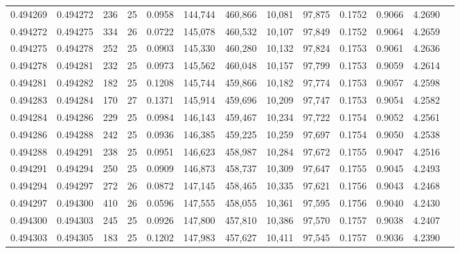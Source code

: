 \begin{tabular}{rrrrrrrrrrrrr}
0.494269 & 0.494272 & 236 &  25 &                                     0.0958 & 144,744 & 460,866 &  10,081 &  97,875 & 0.1752 & 0.9066 & 4.2690 \\
0.494272 & 0.494275 & 334 &  26 &                                     0.0722 & 145,078 & 460,532 &  10,107 &  97,849 & 0.1752 & 0.9064 & 4.2659 \\
0.494275 & 0.494278 & 252 &  25 &                                     0.0903 & 145,330 & 460,280 &  10,132 &  97,824 & 0.1753 & 0.9061 & 4.2636 \\
0.494278 & 0.494281 & 232 &  25 &                                     0.0973 & 145,562 & 460,048 &  10,157 &  97,799 & 0.1753 & 0.9059 & 4.2614 \\
0.494281 & 0.494282 & 182 &  25 &                                     0.1208 & 145,744 & 459,866 &  10,182 &  97,774 & 0.1753 & 0.9057 & 4.2598 \\
0.494283 & 0.494284 & 170 &  27 &                                     0.1371 & 145,914 & 459,696 &  10,209 &  97,747 & 0.1753 & 0.9054 & 4.2582 \\
0.494284 & 0.494286 & 229 &  25 &                                     0.0984 & 146,143 & 459,467 &  10,234 &  97,722 & 0.1754 & 0.9052 & 4.2561 \\
0.494286 & 0.494288 & 242 &  25 &                                     0.0936 & 146,385 & 459,225 &  10,259 &  97,697 & 0.1754 & 0.9050 & 4.2538 \\
0.494288 & 0.494291 & 238 &  25 &                                     0.0951 & 146,623 & 458,987 &  10,284 &  97,672 & 0.1755 & 0.9047 & 4.2516 \\
0.494291 & 0.494294 & 250 &  25 &                                     0.0909 & 146,873 & 458,737 &  10,309 &  97,647 & 0.1755 & 0.9045 & 4.2493 \\
0.494294 & 0.494297 & 272 &  26 &                                     0.0872 & 147,145 & 458,465 &  10,335 &  97,621 & 0.1756 & 0.9043 & 4.2468 \\
0.494297 & 0.494300 & 410 &  26 &                                     0.0596 & 147,555 & 458,055 &  10,361 &  97,595 & 0.1756 & 0.9040 & 4.2430 \\
0.494300 & 0.494303 & 245 &  25 &                                     0.0926 & 147,800 & 457,810 &  10,386 &  97,570 & 0.1757 & 0.9038 & 4.2407 \\
0.494303 & 0.494305 & 183 &  25 &                                     0.1202 & 147,983 & 457,627 &  10,411 &  97,545 & 0.1757 & 0.9036 & 4.2390 \\

\end{tabular}
